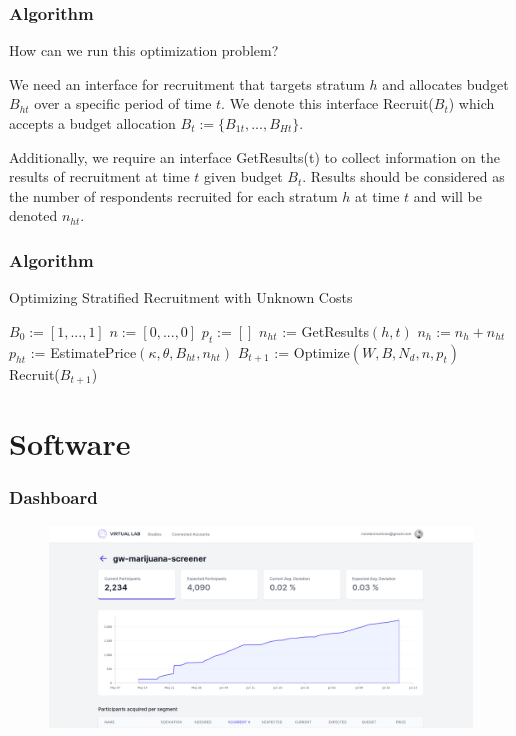 \documentclass[aspectratio=169]{beamer}
\begin{document}
\begin{frame}
\frametitle{Algorithm}

How can we run this optimization problem?

We need an interface for recruitment that targets stratum $h$ and allocates budget $B_{ht}$ over a specific period of time $t$. We denote this interface Recruit($B_{t}$) which accepts a budget allocation $B_t := \{B_{1t},...,B_{Ht}\}$.

Additionally, we require an interface GetResults(t) to collect information on the results of recruitment at time $t$ given budget $B_t$. Results should be considered as the number of respondents recruited for each stratum $h$ at time $t$ and will be denoted $n_{ht}$.

\end{frame}
\begin{frame}
\frametitle{Algorithm}

\begin{algorithm}[H]
\scriptsize
\caption{Optimizing Stratified Recruitment with Unknown Costs}
\begin{algorithmic}

\State $B_0 := [1,...,1]$ 
\State $n := [0,...,0]$ 
  \State $p_t := []$ 
    \State $n_{ht}$ := GetResults$(h, t)$
    \State $n_h := n_h + n_{ht}$
    \State $p_{ht}$ := EstimatePrice$(\kappa, \theta, B_{ht}, n_{ht})$
  \EndFor
  \State $B_{t+1}$ := Optimize$(W, B, N_d, n, p_t)$
  \State Recruit($B_{t+1}$)
\EndFor
\EndProcedure
\end{algorithmic}
\end{algorithm}
\end{frame}

\section{Software}

\begin{frame}
\frametitle{Dashboard}

\begin{figure}[H]
\includegraphics[width=\textwidth]{Figures/vlab-dash-1.png}
\end{figure}
\end{frame}
\end{document}
